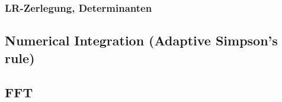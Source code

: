 \subsubsection{LR-Zerlegung, Determinanten}



\subsection{Numerical Integration (Adaptive Simpson's rule)}











\subsection{FFT}

